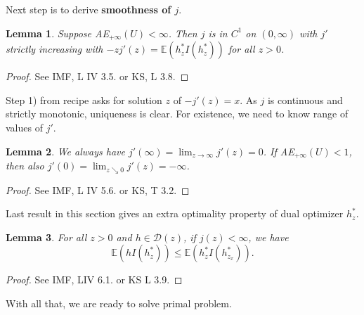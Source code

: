 \documentclass[12pt,a4paper, twoside]{article}
\newtheorem{lem}{Lemma}[section]
\theoremstyle{definition}
\newcommand{\EE}{\mathbb{E}} %
\begin{document}
\\\\
Next step is to derive \textbf{smoothness of $j$}.
\begin{lem} \label{L125} Suppose AE$_{+ \infty}(U) < \infty$. Then $j$ is in $C^1$ on $(0, \infty)$ with $j'$ strictly increasing with $-zj'(z)= \EE(h_z^* I(h_z^*))$ for all $z>0$. 
\end{lem}
\begin{proof}
See IMF, L IV 3.5. or KS, L 3.8.
\end{proof}
Step 1) from recipe asks for solution $z$ of $-j'(z)=x$. As $j$ is continuous and strictly monotonic, uniqueness is clear. For existence, we need to know range of values of $j'$. 
\begin{lem} \label{L126} We always have $j'( \infty) = \lim_{z \to \infty} j'(z)= 0$. If AE$_{+ \infty}(U) <1$, then also $j'(0)= \lim_{z \searrow 0 } j'(z) = - \infty$. 
\end{lem}
\begin{proof}
See IMF, L IV 5.6. or KS, T 3.2.
\end{proof}
\noindent Last result in this section gives an extra optimality property of dual optimizer $h_z^*$. 
\begin{lem} \label{L127} For all $z>0$ and $h \in \mathcal{D}(z)$, if $j(z) < \infty$, we have $$\EE(hI(h_z^*)) \leq \EE(h_z^* I(h_{z_x}^*)).$$
\end{lem}
\begin{proof}
See IMF, LIV 6.1. or KS L 3.9.
\end{proof}
With all that, we are ready to solve primal problem. 
\newpage
\end{document}
